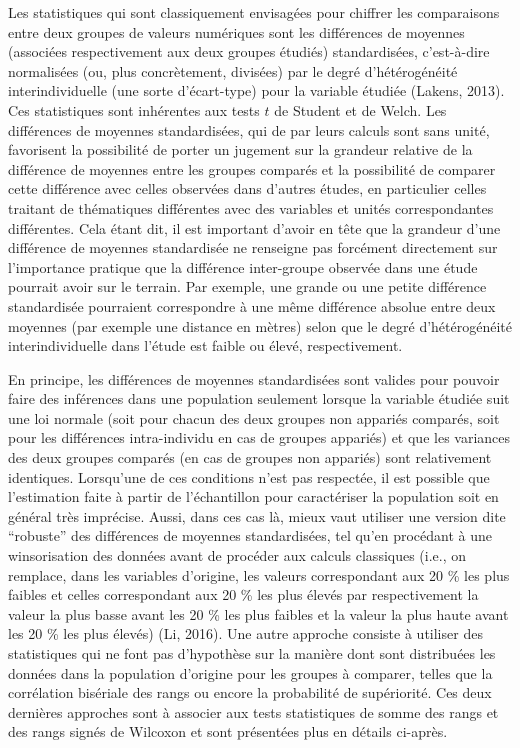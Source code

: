 \documentclass[
  letterpaper,
]{book}
\begin{document}
Les statistiques qui sont classiquement envisagées pour chiffrer les
comparaisons entre deux groupes de valeurs numériques sont les
différences de moyennes (associées respectivement aux deux groupes
étudiés) standardisées, c'est-à-dire normalisées (ou, plus concrètement,
divisées) par le degré d'hétérogénéité interindividuelle (une sorte
d'écart-type) pour la variable étudiée (Lakens, 2013). Ces statistiques
sont inhérentes aux tests \(t\) de Student et de Welch. Les différences
de moyennes standardisées, qui de par leurs calculs sont sans unité,
favorisent la possibilité de porter un jugement sur la grandeur relative
de la différence de moyennes entre les groupes comparés et la
possibilité de comparer cette différence avec celles observées dans
d'autres études, en particulier celles traitant de thématiques
différentes avec des variables et unités correspondantes différentes.
Cela étant dit, il est important d'avoir en tête que la grandeur d'une
différence de moyennes standardisée ne renseigne pas forcément
directement sur l'importance pratique que la différence inter-groupe
observée dans une étude pourrait avoir sur le terrain. Par exemple, une
grande ou une petite différence standardisée pourraient correspondre à
une même différence absolue entre deux moyennes (par exemple une
distance en mètres) selon que le degré d'hétérogénéité interindividuelle
dans l'étude est faible ou élevé, respectivement.

En principe, les différences de moyennes standardisées sont valides pour
pouvoir faire des inférences dans une population seulement lorsque la
variable étudiée suit une loi normale (soit pour chacun des deux groupes
non appariés comparés, soit pour les différences intra-individu en cas
de groupes appariés) et que les variances des deux groupes comparés (en
cas de groupes non appariés) sont relativement identiques. Lorsqu'une de
ces conditions n'est pas respectée, il est possible que l'estimation
faite à partir de l'échantillon pour caractériser la population soit en
général très imprécise. Aussi, dans ces cas là, mieux vaut utiliser une
version dite ``robuste'' des différences de moyennes standardisées, tel
qu'en procédant à une winsorisation des données avant de procéder aux
calculs classiques (i.e., on remplace, dans les variables d'origine, les
valeurs correspondant aux 20 \% les plus faibles et celles correspondant
aux 20 \% les plus élevés par respectivement la valeur la plus basse
avant les 20 \% les plus faibles et la valeur la plus haute avant les 20
\% les plus élevés) (Li, 2016). Une autre approche consiste à utiliser
des statistiques qui ne font pas d'hypothèse sur la manière dont sont
distribuées les données dans la population d'origine pour les groupes à
comparer, telles que la corrélation bisériale des rangs ou encore la
probabilité de supériorité. Ces deux dernières approches sont à associer
aux tests statistiques de somme des rangs et des rangs signés de
Wilcoxon et sont présentées plus en détails ci-après.
\end{document}
